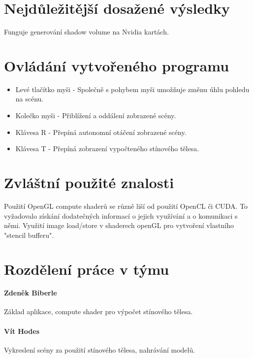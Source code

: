 \documentclass[11pt,a4paper]{article}
\begin{document}
\section{Nejdůležitější dosažené výsledky}

Funguje generování shadow volume na Nvidia kartách.

\section{Ovládání vytvořeného programu}

\begin{itemize}
	\item Levé tlačítko myši - Společně s pohybem myši umožňuje změnu úhlu pohledu na scénu.
	\item Kolečko myši - Přiblížení a oddálení zobrazené scény.
	\item Klávesa R - Přepíná autonomní otáčení zobrazené scény.
	\item Klávesa T - Přepíná zobrazení vypočteného stínového tělesa.
\end{itemize}

\section{Zvláštní použité znalosti}

Použití OpenGL compute shaderů se různě liší od použití OpenCL či CUDA. To vyžadovalo získání dodatečných informací o jejich využívání a o komunikaci s němi.
Využití image load/store v shaderech openGL pro vytvoření vlastního "stencil bufferu".

\section{Rozdělení práce v týmu}

\paragraph{Zdeněk Biberle} Základ aplikace, compute shader pro výpočet stínového tělesa.
\paragraph{Vít Hodes} Vykreslení scény za použití stínového tělesa, nahrávání modelů.
\end{document}
